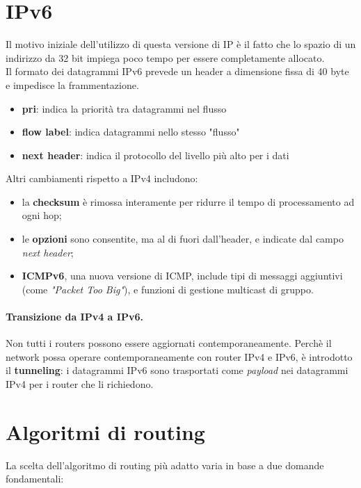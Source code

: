\section{IPv6}
Il motivo iniziale dell'utilizzo di questa versione di IP è il fatto che lo spazio di un indirizzo da 32 bit impiega poco tempo per essere completamente allocato. \\
Il formato dei datagrammi IPv6 prevede un header a dimensione fissa di 40 byte e impedisce la frammentazione.
\begin{itemize}
	\item \textbf{pri}: indica la priorità tra datagrammi nel flusso
	\item \textbf{flow label}: indica datagrammi nello stesso "flusso"
	\item \textbf{next header}: indica il protocollo del livello più alto per i dati%
\end{itemize}
Altri cambiamenti rispetto a IPv4 includono:
\begin{itemize}
	\item la \textbf{checksum} è rimossa interamente per ridurre il tempo di processamento ad ogni hop;
	\item le \textbf{opzioni} sono consentite, ma al di fuori dall'header, e indicate dal campo \textit{next header};
	\item \textbf{ICMPv6}, una nuova versione di ICMP, include tipi di messaggi aggiuntivi (come \textit{"Packet Too Big"}), e funzioni di gestione multicast di gruppo.
\end{itemize}
\paragraph{Transizione da IPv4 a IPv6.}
Non tutti i routers possono essere aggiornati contemporaneamente. Perchè il network possa operare contemporaneamente con router IPv4 e IPv6, è introdotto il \textbf{tunneling}: i datagrammi IPv6 sono trasportati come \textit{payload} nei datagrammi IPv4 per i router che li richiedono.
\section{Algoritmi di routing}
La scelta dell'algoritmo di routing più adatto varia in base a due domande fondamentali:
